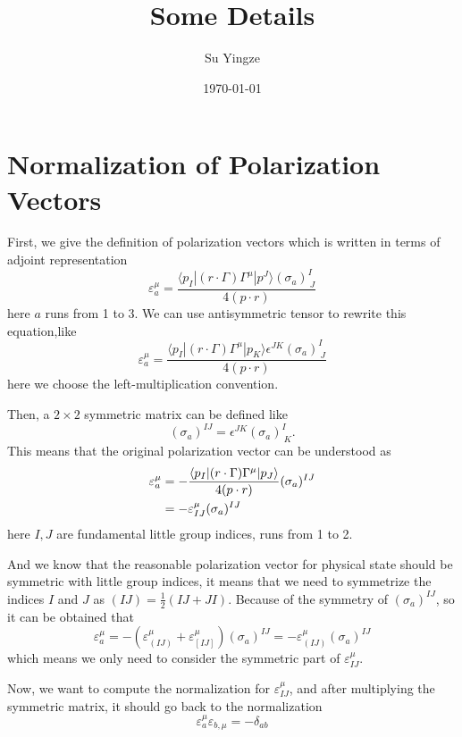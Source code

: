 \documentclass[12pt]{article}
\newcommand{\aket}[1]{|#1\rangle}
\newcommand{\abra}[1]{\langle #1|}
\begin{document}
\title{Some Details}
\author{Su Yingze}
\date{\today}
\maketitle
\section{Normalization of Polarization Vectors}
First, we give the definition of polarization vectors which is written in terms of adjoint representation
\begin{equation}
    \varepsilon_a^\mu=\frac{\abra{p_I}(r\cdot \Gamma)\Gamma^\mu\aket{p^J}(\sigma_a)^I_{\ J}}{4(p\cdot r)}
\end{equation}
here $a$ runs from 1 to 3. We can use antisymmetric tensor to rewrite this equation,like 
\begin{equation}
    \varepsilon_a^\mu=\frac{\abra{p_I}(r\cdot \Gamma)\Gamma^\mu\aket{p_K}\epsilon^{JK}(\sigma_a)^I_{\ J}}{4(p\cdot r)}
\end{equation}
here we choose the left-multiplication convention.

Then, a $2\times 2$ symmetric matrix can be defined like 
\begin{equation}
    (\sigma_a)^{IJ}=\epsilon^{JK}(\sigma_a)^I_{\ K}.
\end{equation}
This means that the original polarization vector can be understood as 
\begin{align}
    \varepsilon_a^\mu&=-\frac{\abra{p_I}(r\cdot \Gamma)\Gamma^\mu\aket{p_J}}{4(p\cdot r)}(\sigma_a)^{IJ}\notag \\
    &=-\varepsilon^\mu_{IJ}(\sigma_a)^{IJ}
\end{align}
here $I,J$ are fundamental little group indices, runs from 1 to 2.

And we know that the reasonable polarization vector for physical state should be symmetric with little group indices, it means that we need 
to symmetrize the indices $I$ and $J$ as $(IJ)=\frac{1}{2}(IJ+JI)$. Because of the symmetry of $(\sigma_a)^{IJ}$, so it can be obtained that
\begin{equation}
    \varepsilon_a^\mu =-(\varepsilon^\mu_{(IJ)}+\varepsilon^\mu_{[IJ]})(\sigma_a)^{IJ}=-\varepsilon^\mu_{(IJ)}(\sigma_a)^{IJ}
\end{equation}
which means we only need to consider the symmetric part of $\varepsilon^\mu_{IJ}$.

Now, we want to compute the normalization for $\varepsilon^\mu_{IJ}$, and after multiplying the symmetric matrix, it should go back to the normalization
\begin{equation}
    \varepsilon_a^\mu\varepsilon_{b,\mu}=-\delta_{ab}
\end{equation}
\end{document}
